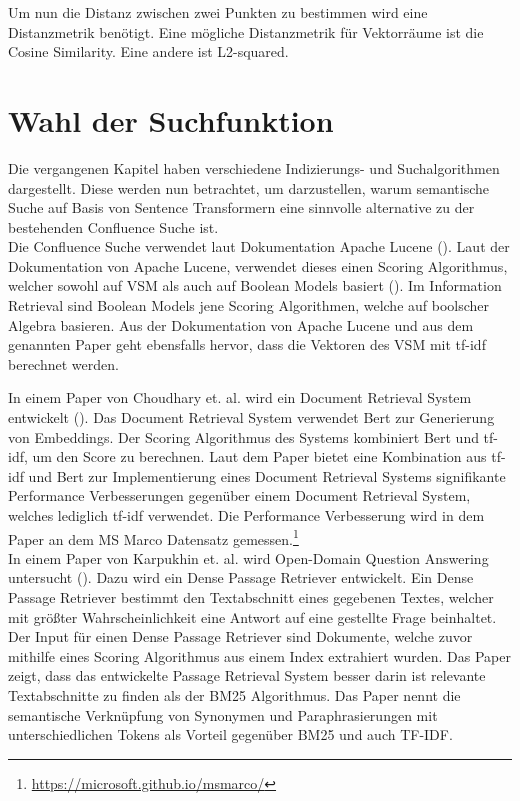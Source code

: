 Um nun die Distanz zwischen zwei Punkten zu bestimmen wird eine Distanzmetrik benötigt.
Eine mögliche Distanzmetrik für Vektorräume ist die Cosine Similarity.
Eine andere ist L2-squared.

\section{Wahl der Suchfunktion}

Die vergangenen Kapitel haben verschiedene Indizierungs- und Suchalgorithmen dargestellt.
Diese werden nun betrachtet, um darzustellen, warum semantische Suche auf Basis von Sentence Transformern eine sinnvolle alternative zu der bestehenden Confluence Suche ist.\\

Die Confluence Suche verwendet laut Dokumentation Apache Lucene (\cite{Confluence_Ranking}).
Laut der Dokumentation von Apache Lucene, verwendet dieses einen Scoring Algorithmus, welcher sowohl auf VSM als auch auf Boolean Models basiert (\cite{Lucene_Scoring}).
Im Information Retrieval sind Boolean Models jene Scoring Algorithmen, welche auf boolscher Algebra basieren.
Aus der Dokumentation von Apache Lucene und aus dem genannten Paper geht ebensfalls hervor, dass die Vektoren des VSM mit tf-idf berechnet werden.

In einem Paper von Choudhary et. al. wird ein Document Retrieval System entwickelt (\cite{Choudhary_Guttikonda_Chowdhury_Learmonth_2020}).
Das Document Retrieval System verwendet Bert zur Generierung von Embeddings.
Der Scoring Algorithmus des Systems kombiniert Bert und tf-idf, um den Score zu berechnen.
Laut dem Paper bietet eine Kombination aus tf-idf und Bert zur Implementierung eines Document Retrieval Systems signifikante Performance Verbesserungen gegenüber einem Document Retrieval System, welches lediglich tf-idf verwendet.
Die Performance Verbesserung wird in dem Paper an dem MS Marco Datensatz gemessen.\footnote{\url{https://microsoft.github.io/msmarco/}}\\

In einem Paper von Karpukhin et. al. wird Open-Domain Question Answering untersucht (\cite{Karpukhin_Oguz_Min_Lewis_Wu_Edunov_Chen_Yih_2020}).
Dazu wird ein Dense Passage Retriever entwickelt.
Ein Dense Passage Retriever bestimmt den Textabschnitt eines gegebenen Textes, welcher mit größter Wahrscheinlichkeit eine Antwort auf eine gestellte Frage beinhaltet.
Der Input für einen Dense Passage Retriever sind Dokumente, welche zuvor mithilfe eines Scoring Algorithmus aus einem Index extrahiert wurden.
Das Paper zeigt, dass das entwickelte Passage Retrieval System besser darin ist relevante Textabschnitte zu finden als der BM25 Algorithmus. 
Das Paper nennt die semantische Verknüpfung von Synonymen und Paraphrasierungen mit unterschiedlichen Tokens als Vorteil gegenüber BM25 und auch TF-IDF.\\

